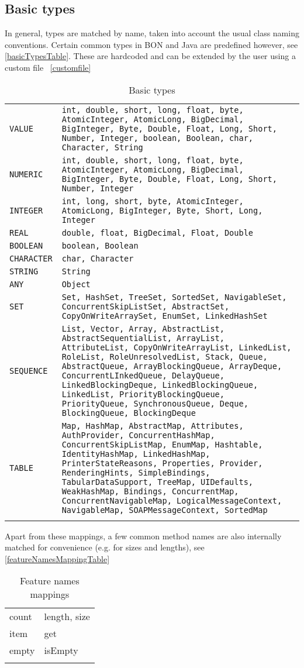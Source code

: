 \documentclass[11pt]{amsart}
\newcommand{\mytablebeg}{\begin{table}[h]\centering\begin{footnotesize}
\begin{tabular}{m{7cm}|m{7cm}} }
\newcommand{\mytableend}[2]{\end{tabular}\end{footnotesize}\caption{#1} \label{#2}\end{table}}
\newcommand{\simpleline}[2]{#1 & #2\\ \hdashline}
\begin{document}
\subsection{Basic types}\label{basictypes}\hfill \newline
In general, types are matched by name, taken into account the usual class naming conventions. Certain common types in BON and Java are predefined however, see \autoref{basicTypesTable}. These are hardcoded and can be extended by the user using a custom file ~\ref{customfile}
\mytablebeg
\texttt{}
\simpleline{\texttt{VALUE}}{\texttt{int, double, short, long, float, byte, AtomicInteger, AtomicLong, BigDecimal, BigInteger, Byte, Double, Float, Long, Short, Number, Integer, boolean, Boolean, char, Character, String}}
\simpleline{\texttt{NUMERIC}}{\texttt{int, double, short, long, float, byte, AtomicInteger, AtomicLong, BigDecimal, BigInteger, Byte, Double, Float, Long, Short, Number, Integer}}
\simpleline{\texttt{INTEGER}}{\texttt{int, long, short, byte, AtomicInteger, AtomicLong, BigInteger, Byte, Short, Long, Integer}}
\simpleline{\texttt{REAL}}{\texttt{double, float, BigDecimal, Float, Double}}
\simpleline{\texttt{BOOLEAN}}{\texttt{boolean, Boolean}}
\simpleline{\texttt{CHARACTER}}{\texttt{char, Character}}
\simpleline{\texttt{STRING}}{\texttt{String}}
\simpleline{\texttt{ANY}}{\texttt{Object}}
\simpleline{\texttt{SET}}{\texttt{Set, HashSet, TreeSet, SortedSet, NavigableSet, ConcurrentSkipListSet, AbstractSet, CopyOnWriteArraySet, EnumSet, LinkedHashSet}}
\simpleline{\texttt{SEQUENCE}}{\texttt{List, Vector, Array, AbstractList, AbstractSequentialList, ArrayList, AttributeList, CopyOnWriteArrayList, LinkedList, RoleList, RoleUnresolvedList, Stack, Queue, AbstractQueue, ArrayBlockingQueue, ArrayDeque, ConcurrentLInkedQueue, DelayQueue, LinkedBlockingDeque, LinkedBlockingQueue, LinkedList, PriorityBlockingQueue, PriorityQueue, SynchronousQueue, Deque, BlockingQueue, BlockingDeque}}
\simpleline{\texttt{TABLE}}{\texttt{Map, HashMap, AbstractMap, Attributes, AuthProvider, ConcurrentHashMap, ConcurrentSkipListMap, EnumMap, Hashtable, IdentityHashMap, LinkedHashMap, PrinterStateReasons, Properties, Provider, RenderingHints, SimpleBindings, TabularDataSupport, TreeMap, UIDefaults, WeakHashMap, Bindings, ConcurrentMap, ConcurrentNavigableMap, LogicalMessageContext, NavigableMap, SOAPMessageContext, SortedMap}}
\mytableend{Basic types}{basicTypesTable}

Apart from these mappings, a few common method names are also internally matched for convenience (e.g. for sizes and lengths), see \autoref{featureNamesMappingTable}
\mytablebeg
\simpleline{count}{length, size}
\simpleline{item}{get}
\simpleline{empty}{isEmpty}
\mytableend{Feature names mappings}{featureNamesMappingTable}
\end{document}
